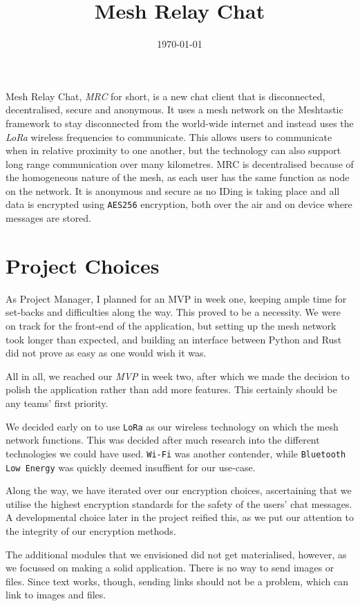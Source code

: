 \documentclass{jatex-article}
\title{Mesh Relay Chat}
\date{\today}
\begin{document}
\justify{}
\maketitle

Mesh Relay Chat, \textit{MRC} for short, is a new chat client that is
disconnected, decentralised, secure and anonymous. It uses a mesh network on
the Meshtastic framework to stay disconnected from the world-wide internet and
instead uses the \textit{LoRa} wireless frequencies to communicate. This allows
users to communicate when in relative proximity to one another, but the
technology can also support long range communication over many kilometres. MRC
is decentralised because of the homogeneous nature of the mesh, as each user
has the same function as node on the network. It is anonymous and secure as no
IDing is taking place and all data is encrypted using \texttt{AES256}
encryption, both over the air and on device where messages are stored.

\section*{Project Choices}

As Project Manager, I planned for an MVP in week one, keeping ample time for
set-backs and difficulties along the way. This proved to be a necessity. We
were on track for the front-end of the application, but setting up the mesh
network took longer than expected, and building an interface between Python and
Rust did not prove as easy as one would wish it was.

All in all, we reached our \textit{MVP} in week two, after which we made the
decision to polish the application rather than add more features. This
certainly should be any teams' first priority.

We decided early on to use \texttt{LoRa} as our wireless technology on which
the mesh network functions. This was decided after much research into the
different technologies we could have used. \texttt{Wi-Fi} was another
contender, while \texttt{Bluetooth Low Energy} was quickly deemed insuffient
for our use-case.

Along the way, we have iterated over our encryption choices, ascertaining that
we utilise the highest encryption standards for the safety of the users' chat
messages. A developmental choice later in the project reified this, as we put
our attention to the integrity of our encryption methods.

The additional modules that we envisioned did not get materialised, however, as
we focussed on making a solid application. There is no way to send images or
files. Since text works, though, sending links should not be a problem, which
can link to images and files.
\end{document}
